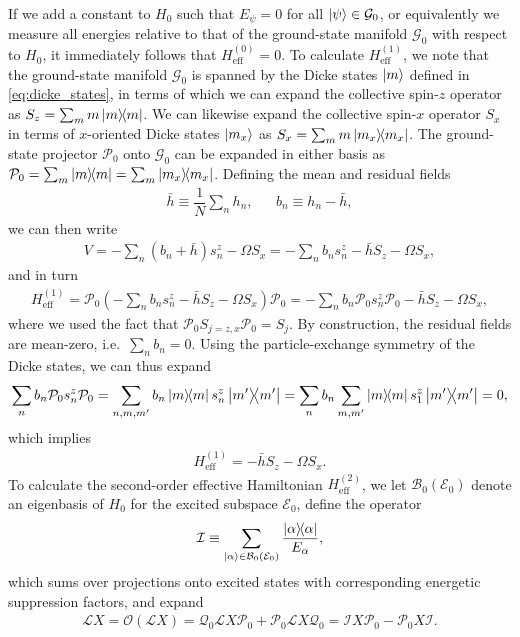 \documentclass[aps,notitlepage,nofootinbib,11pt]{revtex4-1}
\renewcommand{\t}{\text} %
\newcommand{\f}[2]{\dfrac{#1}{#2}} %
\newcommand{\p}[1]{\left(#1\right)} %
\newcommand{\B}{\mathcal{B}}
\newcommand{\E}{\mathcal{E}}
\newcommand{\G}{\mathcal{G}}
\newcommand{\I}{\mathcal{I}}
\renewcommand{\L}{\mathcal{L}}
\renewcommand{\O}{\mathcal{O}}
\renewcommand{\P}{\mathcal{P}}
\newcommand{\Q}{\mathcal{Q}}
\newcommand{\1}{\mathds{1}}
\begin{document}
If we add a constant to $H_0$ such that $E_\psi=0$ for all
$\ket\psi\in\G_0$, or equivalently we measure all energies relative to
that of the ground-state manifold $\G_0$ with respect to $H_0$, it
immediately follows that $H_{\t{eff}}^{(0)}=0$.  To calculate
$H_{\t{eff}}^{(1)}$, we note that the ground-state manifold $\G_0$ is
spanned by the Dicke states $\ket{m}$ defined in
\eqref{eq:dicke_states}, in terms of which we can expand the
collective spin-$z$ operator as $S_z=\sum_mm\op{m}$.  We can likewise
expand the collective spin-$x$ operator $S_x$ in terms of $x$-oriented
Dicke states $\ket{m_x}$ as $S_x=\sum_mm\op{m_x}$.  The ground-state
projector $\P_0$ onto $\G_0$ can be expanded in either basis as
$\P_0=\sum_m\op{m}=\sum_m\op{m_x}$.  Defining the mean and residual
fields
\begin{align}
  \bar h \equiv \f1N \sum_n h_n,
  &&
  b_n \equiv h_n - \bar h,
\end{align}
we can then write
\begin{align}
  V = -\sum_n \p{b_n+\bar h} s_n^z - \Omega S_x
  = -\sum_n b_n s_n^z - \bar h S_z - \Omega S_x,
\end{align}
and in turn
\begin{align}
  H_{\t{eff}}^{(1)}
  = \P_0\p{-\sum_n b_n s_n^z - \bar h S_z - \Omega S_x} \P_0
  = -\sum_n b_n \P_0 s_n^z\P_0 - \bar h S_z - \Omega S_x,
\end{align}
where we used the fact that $\P_0 S_{j=z,x} \P_0 = S_j$.  By
construction, the residual fields are mean-zero, i.e.~$\sum_nb_n=0$.
Using the particle-exchange symmetry of the Dicke states, we can thus
expand
\begin{align}
  \sum_n b_n \P_0 s_n^z \P_0
  = \sum_{n,m,m'} b_n \op{m} s_n^z \op{m'}
  = \sum_n b_n \sum_{m,m'} \op{m} s_1^z \op{m'}
  = 0,
\end{align}
which implies
\begin{align}
  H_{\t{eff}}^{(1)} = - \bar h S_z - \Omega S_x.
\end{align}
To calculate the second-order effective Hamiltonian
$H_{\t{eff}}^{(2)}$, we let $\B_0\p{\E_0}$ denote an eigenbasis of
$H_0$ for the excited subspace $\E_0$, define the operator
\begin{align}
  \I \equiv \sum_{\ket\alpha\in\B_0\p{\E_0}} \f{\op\alpha}{E_\alpha},
\end{align}
which sums over projections onto excited states with corresponding
energetic suppression factors, and expand
\begin{align}
  \L X = \O\p{\L X}
  = \Q_0 \L X \P_0 + \P_0 \L X \Q_0
  = \I X \P_0 - \P_0 X \I.
\end{align}
\end{document}

